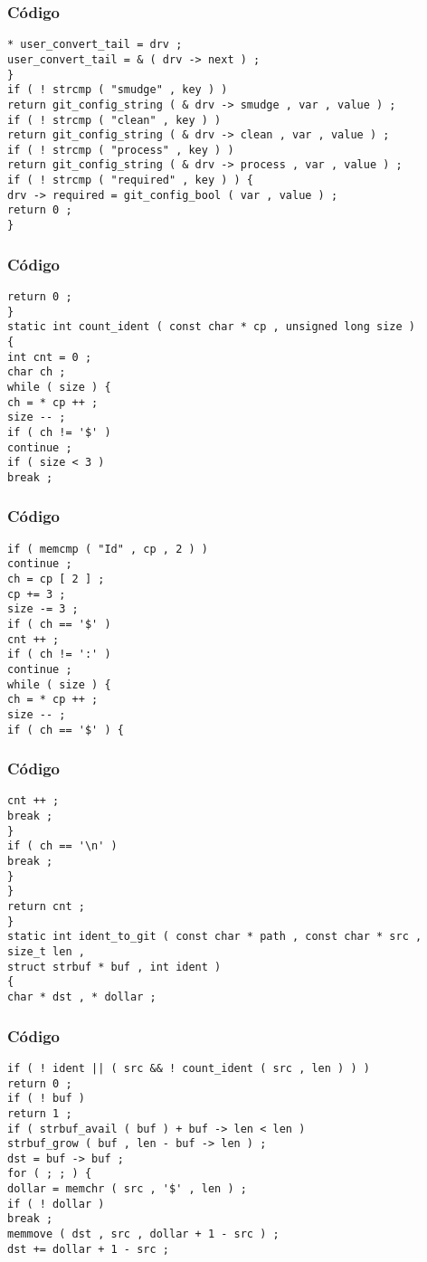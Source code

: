 \documentclass{beamer}
\begin{document}
\begin{frame}[fragile]
\frametitle{C\'odigo}
\begin{verbatim}
* user_convert_tail = drv ; 
user_convert_tail = & ( drv -> next ) ; 
} 
if ( ! strcmp ( "smudge" , key ) ) 
return git_config_string ( & drv -> smudge , var , value ) ; 
if ( ! strcmp ( "clean" , key ) ) 
return git_config_string ( & drv -> clean , var , value ) ; 
if ( ! strcmp ( "process" , key ) ) 
return git_config_string ( & drv -> process , var , value ) ; 
if ( ! strcmp ( "required" , key ) ) { 
drv -> required = git_config_bool ( var , value ) ; 
return 0 ; 
} 
\end{verbatim}
\end{frame}
\begin{frame}[fragile]
\frametitle{C\'odigo}
\begin{verbatim}
return 0 ; 
} 
static int count_ident ( const char * cp , unsigned long size ) 
{ 
int cnt = 0 ; 
char ch ; 
while ( size ) { 
ch = * cp ++ ; 
size -- ; 
if ( ch != '$' ) 
continue ; 
if ( size < 3 ) 
break ; 
\end{verbatim}
\end{frame}
\begin{frame}[fragile]
\frametitle{C\'odigo}
\begin{verbatim}
if ( memcmp ( "Id" , cp , 2 ) ) 
continue ; 
ch = cp [ 2 ] ; 
cp += 3 ; 
size -= 3 ; 
if ( ch == '$' ) 
cnt ++ ; 
if ( ch != ':' ) 
continue ; 
while ( size ) { 
ch = * cp ++ ; 
size -- ; 
if ( ch == '$' ) { 
\end{verbatim}
\end{frame}
\begin{frame}[fragile]
\frametitle{C\'odigo}
\begin{verbatim}
cnt ++ ; 
break ; 
} 
if ( ch == '\n' ) 
break ; 
} 
} 
return cnt ; 
} 
static int ident_to_git ( const char * path , const char * src , size_t len , 
struct strbuf * buf , int ident ) 
{ 
char * dst , * dollar ; 
\end{verbatim}
\end{frame}
\begin{frame}[fragile]
\frametitle{C\'odigo}
\begin{verbatim}
if ( ! ident || ( src && ! count_ident ( src , len ) ) ) 
return 0 ; 
if ( ! buf ) 
return 1 ; 
if ( strbuf_avail ( buf ) + buf -> len < len ) 
strbuf_grow ( buf , len - buf -> len ) ; 
dst = buf -> buf ; 
for ( ; ; ) { 
dollar = memchr ( src , '$' , len ) ; 
if ( ! dollar ) 
break ; 
memmove ( dst , src , dollar + 1 - src ) ; 
dst += dollar + 1 - src ; 
\end{verbatim}
\end{frame}
\end{document}
